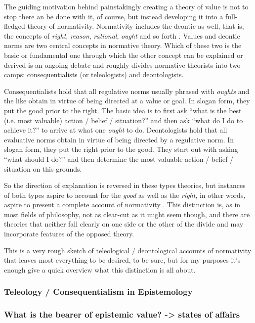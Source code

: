 \documentclass[12pt,numbers=noenddot]{scrartcl}
\begin{document}
The guiding motivation behind painstakingly creating a theory of value is not to stop there an be done with it, of course, but instead developing it into a 
full-fledged theory of normativity. Normativity includes the deontic as well, that is, the concepts of \emph{right}, \emph{reason}, \emph{rational}, \emph{ought} and so forth \autocite[21]{sep-value-theory}. Values and deontic norms are two central concepts in normative theory. Which of these two is the basic or fundamental one through which the other concept can be explained or derived is an ongoing debate and roughly divides normative theorists into two camps: consequentialists (or teleologists) and deontologists. 

Consequentialists hold that all regulative norms usually phrased with \emph{oughts} and the like obtain in virtue of being directed at a value or goal. In slogan form, they put the good prior to the right. The basic idea is to first ask “what is the best (i.e. most valuable) action / belief / situation?” and then ask “what do I do to achieve it?” to arrive at what one \emph{ought} to do. 
Deontologists hold that all evaluative norms obtain in virtue of being directed by a regulative norm. In slogan form, they put the right prior to the good. They start out with asking “what should I do?” and then determine the most valuable action / belief / situation on this grounds. 

So the direction of explanation is reversed in these types theories, but instances of both types aspire to account for the \emph{good} as well as the \emph{right}, in other words, aspire to present a complete account of normativity \parencite[341]{Berker2013-BERETA-2}. This distinction is, as in most fields of philosophy, not as clear-cut as it might seem though, and there are theories that neither fall clearly on one side or the other of the divide and may incorporate features of the opposed theory.

This is a very rough sketch of teleological / deontological accounts of normativity that leaves most everything to be desired, to be sure, but for my purposes it's enough give a quick overview what this distinction is all about.

\subsubsection{Teleology / Consequentialism in Epistemology} \label{subsec: teleologyepistemic}

\subsubsection{ What is the bearer of epistemic value? -> states of affairs}
\end{document}
